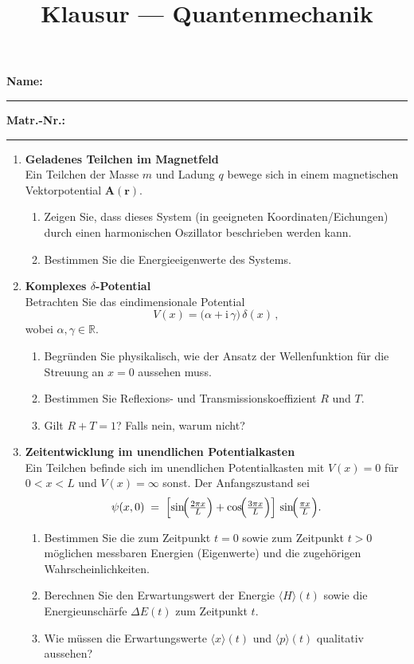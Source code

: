 \documentclass[11pt,a4paper]{article}
\title{Klausur — Quantenmechanik}
\author{}
\date{}
\begin{document}
\maketitle

\noindent\textbf{Name:} \rule{0.6\linewidth}{0.4pt}\hfill\textbf{Matr.-Nr.:} \rule{0.25\linewidth}{0.4pt}

\vspace{1em}

\begin{enumerate}

\item \textbf{Geladenes Teilchen im Magnetfeld}\\
Ein Teilchen der Masse \(m\) und Ladung \(q\) bewege sich in einem magnetischen Vektorpotential \(\mathbf A(\mathbf r)\).
\begin{enumerate}
  \item Zeigen Sie, dass dieses System (in geeigneten Koordinaten/Eichungen) durch einen harmonischen Oszillator beschrieben werden kann.
  \item Bestimmen Sie die Energieeigenwerte des Systems.
\end{enumerate}

\item \textbf{Komplexes \(\delta\)-Potential}\\
Betrachten Sie das eindimensionale Potential
\[
V(x) = \bigl(\alpha + \mathrm i\,\gamma\bigr)\,\delta(x)\,,
\]
wobei \(\alpha,\gamma\in\mathbb R\).
\begin{enumerate}
  \item Begründen Sie physikalisch, wie der Ansatz der Wellenfunktion für die Streuung an \(x=0\) aussehen muss.
  \item Bestimmen Sie Reflexions- und Transmissionskoeffizient \(R\) und \(T\).
  \item Gilt \(R+T=1\)? Falls nein, warum nicht?
\end{enumerate}

\item \textbf{Zeitentwicklung im unendlichen Potentialkasten}\\
Ein Teilchen befinde sich im unendlichen Potentialkasten mit \(V(x)=0\) für \(0<x<L\) und \(V(x)=\infty\) sonst. Der Anfangszustand sei
\[
\psi(x,0) \;=\; \Bigl[\sin\!\Bigl(\tfrac{2\pi x}{L}\Bigr) + \cos\!\Bigl(\tfrac{3\pi x}{L}\Bigr)\Bigr]\,
\sin\!\Bigl(\tfrac{\pi x}{L}\Bigr).
\]
\begin{enumerate}
  \item Bestimmen Sie die zum Zeitpunkt \(t=0\) sowie zum Zeitpunkt \(t>0\) möglichen messbaren Energien (Eigenwerte) und die zugehörigen Wahrscheinlichkeiten.
  \item Berechnen Sie den Erwartungswert der Energie \(\langle H\rangle(t)\) sowie die Energieunschärfe \(\Delta E(t)\) zum Zeitpunkt \(t\).
  \item Wie müssen die Erwartungswerte \(\langle x\rangle(t)\) und \(\langle p\rangle(t)\) qualitativ aussehen?
\end{enumerate}


\end{enumerate}
\end{document}
